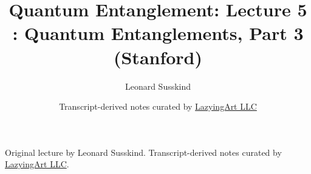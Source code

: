 \documentclass[11pt,oneside]{book}
\begin{document}
\frontmatter
\title{Quantum Entanglement: Lecture 5 : Quantum Entanglements, Part 3 (Stanford)}
\author{Leonard Susskind}
\date{Transcript-derived notes curated by \href{https://lazying.art}{LazyingArt LLC}}
\maketitle
\begin{center}
\small Original lecture by Leonard Susskind. Transcript-derived notes curated by \href{https://lazying.art}{LazyingArt LLC}.
\end{center}
\clearpage
\mainmatter

\end{document}
